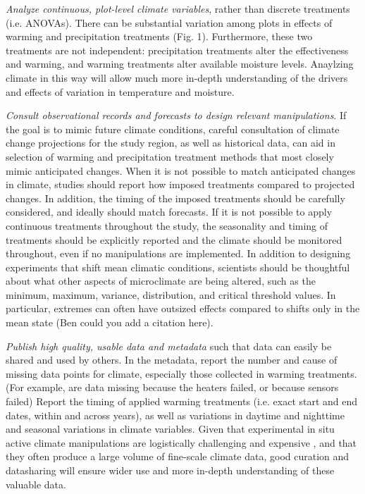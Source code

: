 \documentclass{article}
\begin{document}
\par\textit{Analyze continuous, plot-level climate variables}, rather than discrete treatments (i.e. ANOVAs). There can be substantial variation among plots in effects of warming and precipitation treatments (Fig. 1). Furthermore, these two treatments are not independent: precipitation treatments alter the effectiveness and warming, and warming treatments alter available moisture levels. Anaylzing climate in this way will allow much more in-depth understanding of the drivers and effects of variation in temperature and moisture.
\par\textit{Consult observational records and forecasts to design relevant manipulations}. If the goal is to mimic future climate conditions, careful consultation of climate change projections for the study region, as well as historical data, can aid in selection of warming and precipitation treatment methods that most closely mimic anticipated changes. When it is not possible to match anticipated changes in climate, studies should report how imposed treatments compared to projected changes. In addition, the timing of the imposed treatments should be carefully considered, and ideally should match forecasts. If it is not possible to apply continuous treatments throughout the study, the seasonality and timing of treatments should be explicitly reported and the climate should be monitored throughout, even if no manipulations are implemented. In addition to designing experiments that shift mean climatic conditions, scientists should be thoughtful about what other aspects of microclimate are being altered, such as the minimum, maximum, variance, distribution, and critical threshold values. In particular, extremes can often have outsized effects compared to shifts only in the mean state (Ben could you add a citation here).
\par\textit{Publish high quality, usable data and metadata} such that data can easily be shared and used by others. In the metadata, report the number and cause of missing data points for climate, especially those collected in warming treatments. (For example, are data missing because the heaters failed, or because sensors failed) Report the timing of applied warming treatments (i.e. exact start and end dates, within and across years), as well as variations in daytime and nighttime and seasonal variations in climate variables. Given that experimental in situ active climate  manipulations are logistically challenging  and expensive \citep{aronson2009}, and that they often produce a large volume of fine-scale climate data, good curation and datasharing will ensure wider use and more in-depth understanding of these valuable data. 
\end{document}
